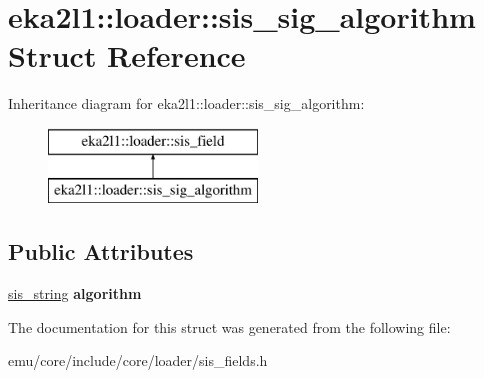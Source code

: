 \hypertarget{structeka2l1_1_1loader_1_1sis__sig__algorithm}{}\section{eka2l1\+:\+:loader\+:\+:sis\+\_\+sig\+\_\+algorithm Struct Reference}
\label{structeka2l1_1_1loader_1_1sis__sig__algorithm}
Inheritance diagram for eka2l1\+:\+:loader\+:\+:sis\+\_\+sig\+\_\+algorithm\+:\begin{figure}[H]
\begin{center}
\leavevmode
\includegraphics[height=2.000000cm]{structeka2l1_1_1loader_1_1sis__sig__algorithm}
\end{center}
\end{figure}
\subsection*{Public Attributes}
\begin{DoxyCompactItemize}
\item 
\mbox{\label{structeka2l1_1_1loader_1_1sis__sig__algorithm_a1507ad55eef469ba823051a9bf511c11}} 
\mbox{\hyperlink{structeka2l1_1_1loader_1_1sis__string}{sis\+\_\+string}} {\bfseries algorithm}
\end{DoxyCompactItemize}


The documentation for this struct was generated from the following file\+:\begin{DoxyCompactItemize}
\item 
emu/core/include/core/loader/sis\+\_\+fields.\+h\end{DoxyCompactItemize}
